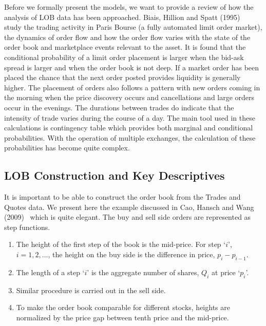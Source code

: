 Before we formally present the models, we want to provide a review of how the analysis of LOB data has been approached. Biais, Hillion and Spatt (1995)~\cite{spalt} study the trading activity in Paris Bourse (a fully automated limit order market), the dynamics of order flow and how the order flow varies with the state of the order book and marketplace events relevant to the asset. It is found that the conditional probability of a limit order placement is larger when the bid-ask spread is larger and when the order book is not deep. If a market order has been placed the chance that the next order posted provides liquidity is generally higher. The placement of orders also follows a pattern with new orders coming in the morning when the price discovery occurs and cancellations and large orders occur in the evenings. The durations between trades do indicate that the intensity of trade varies during the course of a day. The main tool used in these calculations is contingency table which provides both marginal and conditional probabilities. With the operation of multiple exchanges, the calculation of these probabilities has become quite complex. 


\subsection{LOB Construction and Key Descriptives}

It is important to be able to construct the order book from the Trades and Quotes data. We present here the example discussed in Cao, Hansch and Wang (2009)~\cite{caohanschwang} which is quite elegant. The buy and sell side orders are represented as step functions. 
        \begin{enumerate}[--]
        \item The height of the first step of the book is the mid-price. For step `$i$', $i=1,2,\ldots$, the height on the buy side is the difference in price, $p_i-p_{i-1}$. 
        \item The length of a step `$i$' is the aggregate number of shares, $Q_i$ at price `$p_i$'.
        \item Similar procedure is carried out in the sell side.
        \item To make the order book comparable for different stocks, heights are normalized by the price gap between tenth price and the mid-price. 
        \end{enumerate}


